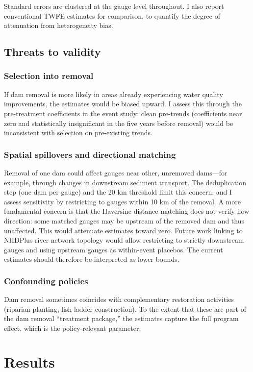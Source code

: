 \documentclass[12pt]{article}
\begin{document}
Standard errors are clustered at the gauge level throughout. I also report conventional TWFE estimates for comparison, to quantify the degree of attenuation from heterogeneity bias.

\subsection{Threats to validity}

\subsubsection*{Selection into removal} If dam removal is more likely in areas already experiencing water quality improvements, the estimates would be biased upward. I assess this through the pre-treatment coefficients in the event study: clean pre-trends (coefficients near zero and statistically insignificant in the five years before removal) would be inconsistent with selection on pre-existing trends.

\subsubsection*{Spatial spillovers and directional matching} Removal of one dam could affect gauges near other, unremoved dams---for example, through changes in downstream sediment transport. The deduplication step (one dam per gauge) and the 20 km threshold limit this concern, and I assess sensitivity by restricting to gauges within 10 km of the removal. A more fundamental concern is that the Haversine distance matching does not verify flow direction: some matched gauges may be upstream of the removed dam and thus unaffected. This would attenuate estimates toward zero. Future work linking to NHDPlus river network topology would allow restricting to strictly downstream gauges and using upstream gauges as within-event placebos. The current estimates should therefore be interpreted as lower bounds.

\subsubsection*{Confounding policies} Dam removal sometimes coincides with complementary restoration activities (riparian planting, fish ladder construction). To the extent that these are part of the dam removal ``treatment package,'' the estimates capture the full program effect, which is the policy-relevant parameter.

\section{Results}
\end{document}
